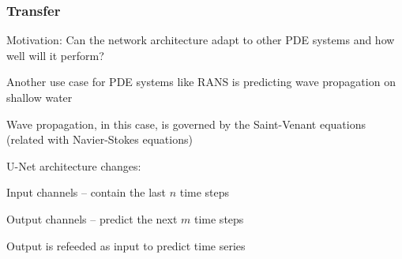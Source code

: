 \begin{frame}
    \frametitle{Transfer}
\vspace*{0.8cm}
Motivation: Can the network architecture adapt to other PDE systems and how well will it perform?

Another use case for PDE systems like RANS is predicting wave propagation on shallow water

Wave propagation, in this case, is governed by the Saint-Venant equations (related with Navier-Stokes equations)

U-Net architecture changes:
\begin{PraesentationAufzaehlung}
    \item Input channels -- contain the last $n$ time steps
    \item Output channels -- predict the next $m$ time steps
    \item Output is refeeded as input to predict time series
\end{PraesentationAufzaehlung}

\end{frame}
\clearpage

